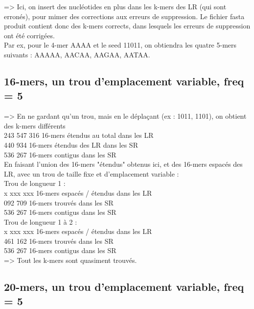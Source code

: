 \documentclass[12pt]{article}
\begin{document}
=> Ici, on insert des nucléotides en plus dans les k-mers des LR (qui sont erronés), pour mimer des corrections
aux erreurs de suppression. Le fichier fasta produit contient donc des k-mers corrects,
dans lesquels les erreurs de suppression ont été corrigées. \\

Par ex, pour le 4-mer AAAA et le seed 11011, on obtiendra les quatre 5-mers suivants : AAAAA, AACAA, AAGAA, AATAA. 

\subsection{16-mers, un trou d'emplacement variable, freq = 5}

=> En ne gardant qu'un trou, mais en le déplaçant (ex : 1011, 1101), on obtient des k-mers différents \\

243 547 316 16-mers étendus au total dans les LR \\
 440 934 16-mers étendus des LR dans les SR \\
 536 267 16-mers contigus dans les SR \\

En faisant l'union des 16-mers "étendus" obtenus ici, et des 16-mers espacés des LR, avec un trou de taille fixe et d'emplacement variable : \\

\indent Trou de longueur 1 : \\
\indent x xxx xxx 16-mers espacés / étendus dans les LR \\
 092 709 16-mers trouvés dans les SR \\
 536 267 16-mers contigus dans les SR \\

\indent Trou de longueur 1 à 2 : \\
\indent x xxx xxx 16-mers espacés / étendus dans les LR \\
 461 162 16-mers trouvés dans les SR \\
 536 267 16-mers contigus dans les SR \\

=> Tout les k-mers sont quasiment trouvés.

\subsection{20-mers, un trou d'emplacement variable, freq = 5}
\end{document}
